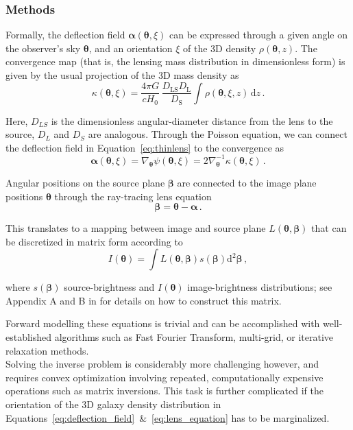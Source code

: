\documentclass[a4paper,10pt]{article}
\begin{document}
\subsubsection{Methods}
\label{sec:org1b680f1}
\label{sec:methods}
Formally, the deflection field \(\bm\alpha(\bm\theta, \xi)\) can be
expressed through a given angle on the observer's sky \(\bm\theta\), and
an orientation \(\xi\) of the 3D density \(\rho(\bm\theta,z)\). The
convergence map (that is, the lensing mass distribution in
dimensionless form) is given by the usual projection of the 3D mass
density as
\begin{equation}\label{eq:thinlens}%
  \kappa(\bm\theta,\xi) = \frac{4\pi G}{cH_0}\, \frac{D_\mathrm{LS}D_\mathrm{L}}{D_\mathrm{S}} \int \rho(\bm\theta,\xi,z)\,\mathrm{d}z \,.
\end{equation}

Here, \(D_{LS}\) is the dimensionless angular-diameter distance from the
lens to the source, \(D_L\) and \(D_S\) are analogous.  Through the
Poisson equation, we can connect the deflection field in
Equation~\eqref{eq:thinlens} to the convergence as
\begin{equation}\label{eq:deflection_field}%
  \bm\alpha(\bm\theta,\xi) = \nabla_{\bm\theta}\psi(\bm\theta,\xi) = 2\nabla_{\bm\theta}^{-1}\kappa(\bm\theta,\xi) \,.
\end{equation}

Angular positions on the source plane \(\bm\beta\) are connected to the
image plane positions \(\bm\theta\) through the ray-tracing lens
equation
\begin{equation}\label{eq:lens_equation}%
  \bm\beta = \bm\theta - \bm\alpha \,.
\end{equation}

This translates to a mapping between image and source plane
\(L(\bm\theta, \bm\beta)\) that can be discretized in matrix form
according to
\begin{equation}%
  I(\bm\theta) = \int L(\bm\theta, \bm\beta) s(\bm\beta) \mathrm{d^{2}}\bm\beta\,,
\end{equation}

where \(s(\bm\beta)\) source-brightness and \(I(\bm\theta)\)
image-brightness distributions; see Appendix A and B in
\cite{Treu2004} for details on how to construct this matrix.

Forward modelling these equations is trivial and can be accomplished
with well-established algorithms such as Fast Fourier Transform,
multi-grid, or iterative relaxation methods. \\[0pt]
Solving the inverse problem is considerably more challenging however,
and requires convex optimization involving repeated, computationally
expensive operations such as matrix inversions. This task is further
complicated if the orientation of the 3D galaxy density distribution
in
Equations~\eqref{eq:deflection_field}~\&~\eqref{eq:lens_equation}
has to be marginalized.
\end{document}
